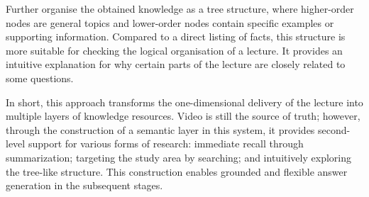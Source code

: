 Further organise the obtained knowledge as a tree structure, where higher-order nodes are general topics and lower-order nodes contain specific examples or supporting information. Compared to a direct listing of facts, this structure is more suitable for checking the logical organisation of a lecture. It provides an intuitive explanation for why certain parts of the lecture are closely related to some questions.

In short, this approach transforms the one-dimensional delivery of the lecture into multiple layers of knowledge resources. Video is still the source of truth; however, through the construction of a semantic layer in this system, it provides second-level support for various forms of research: immediate recall through summarization; targeting the study area by searching; and intuitively exploring the tree-like structure. This construction enables grounded and flexible answer generation in the subsequent stages.
